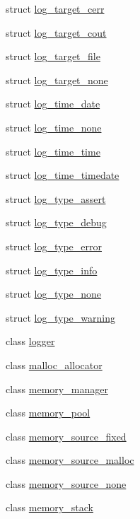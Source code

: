 \begin{DoxyCompactItemize}
struct \hyperlink{structcrap_1_1log__target__cerr}{log\+\_\+target\+\_\+cerr}
\item 
struct \hyperlink{structcrap_1_1log__target__cout}{log\+\_\+target\+\_\+cout}
\item 
struct \hyperlink{structcrap_1_1log__target__file}{log\+\_\+target\+\_\+file}
\item 
struct \hyperlink{structcrap_1_1log__target__none}{log\+\_\+target\+\_\+none}
\item 
struct \hyperlink{structcrap_1_1log__time__date}{log\+\_\+time\+\_\+date}
\item 
struct \hyperlink{structcrap_1_1log__time__none}{log\+\_\+time\+\_\+none}
\item 
struct \hyperlink{structcrap_1_1log__time__time}{log\+\_\+time\+\_\+time}
\item 
struct \hyperlink{structcrap_1_1log__time__timedate}{log\+\_\+time\+\_\+timedate}
\item 
struct \hyperlink{structcrap_1_1log__type__assert}{log\+\_\+type\+\_\+assert}
\item 
struct \hyperlink{structcrap_1_1log__type__debug}{log\+\_\+type\+\_\+debug}
\item 
struct \hyperlink{structcrap_1_1log__type__error}{log\+\_\+type\+\_\+error}
\item 
struct \hyperlink{structcrap_1_1log__type__info}{log\+\_\+type\+\_\+info}
\item 
struct \hyperlink{structcrap_1_1log__type__none}{log\+\_\+type\+\_\+none}
\item 
struct \hyperlink{structcrap_1_1log__type__warning}{log\+\_\+type\+\_\+warning}
\item 
class \hyperlink{singletoncrap_1_1logger}{logger}
\item 
class \hyperlink{classcrap_1_1malloc__allocator}{malloc\+\_\+allocator}
\item 
class \hyperlink{classcrap_1_1memory__manager}{memory\+\_\+manager}
\item 
class \hyperlink{classcrap_1_1memory__pool}{memory\+\_\+pool}
\item 
class \hyperlink{classcrap_1_1memory__source__fixed}{memory\+\_\+source\+\_\+fixed}
\item 
class \hyperlink{classcrap_1_1memory__source__malloc}{memory\+\_\+source\+\_\+malloc}
\item 
class \hyperlink{classcrap_1_1memory__source__none}{memory\+\_\+source\+\_\+none}
\item 
class \hyperlink{classcrap_1_1memory__stack}{memory\+\_\+stack}

\end{DoxyCompactItemize}
